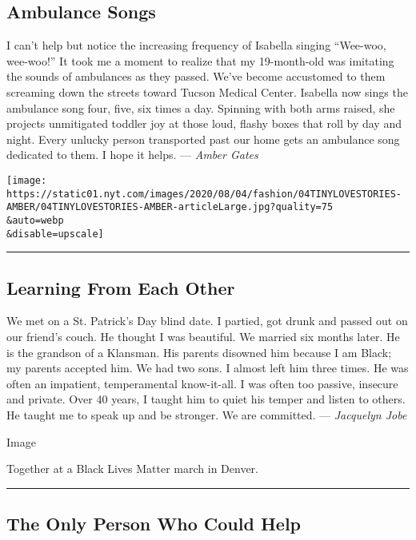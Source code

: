 \hypertarget{ambulance-songs}{%
\subsection{Ambulance Songs}\label{ambulance-songs}}

I can't help but notice the increasing frequency of Isabella singing
``Wee-woo, wee-woo!'' It took me a moment to realize that my
19-month-old was imitating the sounds of ambulances as they passed.
We've become accustomed to them screaming down the streets toward Tucson
Medical Center. Isabella now sings the ambulance song four, five, six
times a day. Spinning with both arms raised, she projects unmitigated
toddler joy at those loud, flashy boxes that roll by day and night.
Every unlucky person transported past our home gets an ambulance song
dedicated to them. I hope it helps. --- \emph{Amber Gates}

\texttt{[image: https://static01.nyt.com/images/2020/08/04/fashion/04TINYLOVESTORIES-AMBER/04TINYLOVESTORIES-AMBER-articleLarge.jpg?quality=75\\\&auto=webp\\\&disable=upscale]}

\begin{center}\rule{0.5\linewidth}{\linethickness}\end{center}

\hypertarget{learning-from-each-other}{%
\subsection{Learning From Each Other}\label{learning-from-each-other}}

We met on a St. Patrick's Day blind date. I partied, got drunk and
passed out on our friend's couch. He thought I was beautiful. We married
six months later. He is the grandson of a Klansman. His parents disowned
him because I am Black; my parents accepted him. We had two sons. I
almost left him three times. He was often an impatient, temperamental
know-it-all. I was often too passive, insecure and private. Over 40
years, I taught him to quiet his temper and listen to others. He taught
me to speak up and be stronger. We are committed. --- \emph{Jacquelyn
Jobe}

Image

Together at a Black Lives Matter march in Denver.

\begin{center}\rule{0.5\linewidth}{\linethickness}\end{center}

\hypertarget{the-only-person-who-could-help}{%
\subsection{The Only Person Who Could
Help}\label{the-only-person-who-could-help}}

